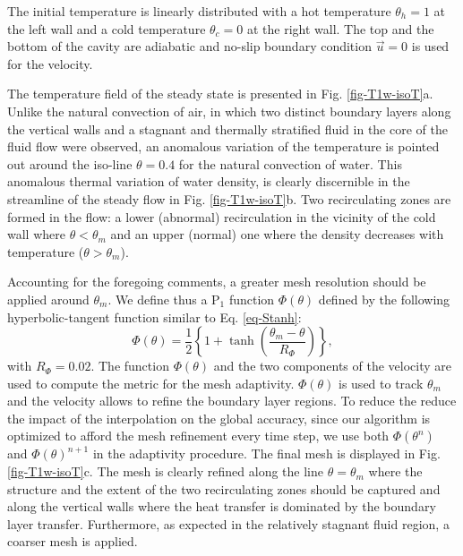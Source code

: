 The initial temperature is linearly distributed with a hot temperature $\theta_h =1$ at the left wall and a cold temperature $\theta_c=0$ at the right wall. %
The top and the bottom of the cavity are adiabatic and no-slip boundary condition $\vec u = 0$ is used for the velocity.

The temperature field of the steady state is presented in Fig. \ref{fig-T1w-isoT}a.
Unlike the natural convection of air, in which two distinct boundary layers along the vertical walls and a stagnant and thermally stratified fluid in the core of the fluid flow were observed, an anomalous variation of the temperature is pointed out around the iso-line $\theta = 0.4$ for the natural convection of water.
This anomalous thermal variation of water density, is clearly discernible in the streamline of the steady flow in Fig. \ref{fig-T1w-isoT}b.
Two recirculating zones are formed in the flow: a lower (abnormal) recirculation  in the vicinity of the cold wall where $\theta<\theta_m$ and an upper (normal) one where the density decreases with temperature ($\theta>\theta_m$).

Accounting for the foregoing comments, a greater mesh resolution should be applied around $\theta_m$.
We define thus a P$_1$ function $\Phi(\theta)$ defined by the following hyperbolic-tangent function similar to Eq. \ref{eq-Stanh}:
\begin{equation}
\Phi(\theta) =  \frac{1}{2}\left\{
1 + \tanh\left(\frac{\theta_m-\theta}{R_{\Phi}}\right)
\right\},
\label{eq-Stm}
\end{equation} 
with $R_{\Phi}=0.02$. 
The function $\Phi(\theta)$ and the two components of the velocity are used to compute the metric for the mesh adaptivity.
$\Phi(\theta)$ is used to track $\theta_m$ and the velocity allows to refine the boundary layer regions.
To reduce the reduce the impact of the interpolation on the global accuracy, since our algorithm is optimized to afford the mesh refinement every time step, we use both $\Phi(\theta^n)$ and $\Phi(\theta)^{n+1}$ in the adaptivity procedure.
The final mesh is displayed in Fig. \ref{fig-T1w-isoT}c.
The mesh is clearly refined along the line $\theta = \theta_m$ where  the structure and the extent of the two recirculating zones should be captured and along the vertical walls where the heat transfer is dominated by the boundary layer transfer.
Furthermore, as expected in the relatively stagnant fluid region, a coarser mesh is applied.

